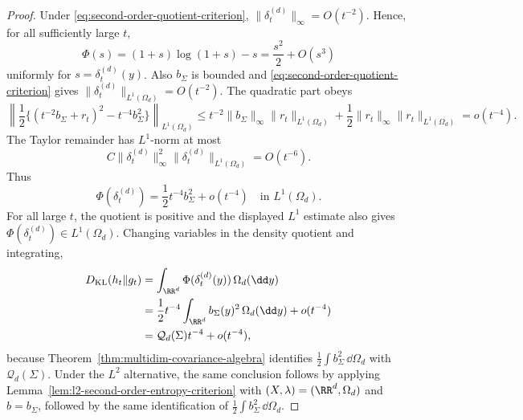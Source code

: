 \begin{proof}
Under \eqref{eq:second-order-quotient-criterion},
\(\|\delta_t^{(d)}\|_\infty=O(t^{-2})\).  Hence, for all sufficiently large
\(t\),
\[
\Phi(s)=(1+s)\log(1+s)-s=\frac{s^2}{2}+O(s^3)
\]
uniformly for \(s=\delta_t^{(d)}(y)\).  Also \(b_\Sigma\) is bounded and
\eqref{eq:second-order-quotient-criterion} gives
\(\|\delta_t^{(d)}\|_{L^1(\Omega_d)}=O(t^{-2})\).  The quadratic part obeys
\[
\left\|\frac12\{(t^{-2}b_\Sigma+r_t)^2-t^{-4}b_\Sigma^2\}\right\|_{L^1(\Omega_d)}
\le
t^{-2}\|b_\Sigma\|_\infty\|r_t\|_{L^1(\Omega_d)}
+\frac12\|r_t\|_\infty\|r_t\|_{L^1(\Omega_d)}
=o(t^{-4}).
\]
The Taylor remainder has \(L^1\)-norm at most
\[
C\|\delta_t^{(d)}\|_\infty^2\|\delta_t^{(d)}\|_{L^1(\Omega_d)}=O(t^{-6}).
\]
Thus
\[
\Phi(\delta_t^{(d)})=\frac12t^{-4}b_\Sigma^2+o(t^{-4})
\quad\text{in }L^1(\Omega_d).
\]
For all large \(t\), the quotient is positive and the displayed \(L^1\)
estimate also gives \(\Phi(\delta_t^{(d)})\in L^1(\Omega_d)\).  Changing
variables in the density quotient and integrating,
\[
\begin{aligned}
D_{\rm KL}(h_t\|g_t)
&=\int_{\RR^d}\Phi(\delta_t^{(d)}(y))\,\Omega_d(\dd y)\\
&=\frac12t^{-4}\int_{\RR^d}b_\Sigma(y)^2\,\Omega_d(\dd y)+o(t^{-4})\\
&=\mathcal Q_d(\Sigma)t^{-4}+o(t^{-4}),
\end{aligned}
\]
because Theorem~\ref{thm:multidim-covariance-algebra} identifies
\(\frac12\int b_\Sigma^2\,\dd\Omega_d\) with \(\mathcal Q_d(\Sigma)\).
Under the \(L^2\) alternative, the same conclusion follows
by applying Lemma~\ref{lem:l2-second-order-entropy-criterion} with
\((X,\lambda)=(\RR^d,\Omega_d)\) and \(b=b_\Sigma\), followed by the same
identification of \(\frac12\int b_\Sigma^2\,\dd\Omega_d\).
\end{proof}
